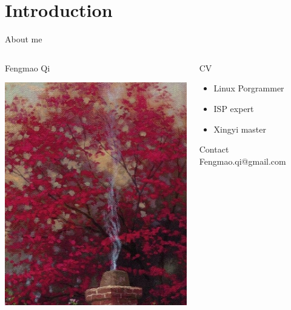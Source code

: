 \documentclass[presentation]{beamer}
\begin{document}
\section{Introduction}
\label{sec:org7c3f5ef}
\begin{frame}[label={sec:orga2265bf}]{About me}
\begin{columns}
\begin{column}{0.45\columnwidth}
\begin{block}{Fengmao Qi}
\begin{center}
\includegraphics[width=.9\linewidth]{imgs/avatar.png}
\end{center}
\end{block}
\end{column}
\begin{column}{0.45\columnwidth}
\begin{block}{CV}
\begin{itemize}
\item Linux Porgrammer
\item ISP expert
\item Xingyi master
\end{itemize}
\begin{block}{Contact}
Fengmao.qi@gmail.com
\end{block}
\end{block}
\end{column}
\end{columns}
\end{frame}
\end{document}
